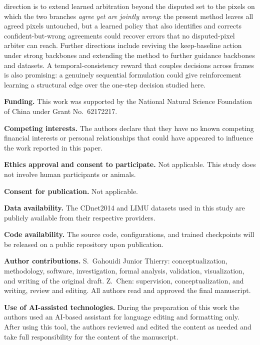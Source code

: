 \documentclass[sn-basic]{sn-jnl}
\begin{document}
direction is to extend learned arbitration beyond the disputed set to the pixels on which
the two branches \emph{agree yet are jointly wrong}: the present method leaves all agreed
pixels untouched, but a learned policy that also identifies and corrects confident-but-wrong
agreements could recover errors that no disputed-pixel arbiter can reach. Further
directions include reviving the keep-baseline action under strong backbones and
extending the method to further guidance backbones and datasets. A temporal-consistency
reward that couples decisions across frames is also promising: a genuinely sequential
formulation could give reinforcement learning a structural edge over the one-step
decision studied here.



\backmatter


\noindent\textbf{Funding.} This work was supported by the National Natural Science
Foundation of China under Grant No.~62172217.

\medskip\noindent\textbf{Competing interests.} The authors declare that they have no
known competing financial interests or personal relationships that could have appeared
to influence the work reported in this paper.

\medskip\noindent\textbf{Ethics approval and consent to participate.} Not applicable.
This study does not involve human participants or animals.

\medskip\noindent\textbf{Consent for publication.} Not applicable.

\medskip\noindent\textbf{Data availability.} The CDnet2014 and LIMU datasets used in
this study are publicly available from their respective providers.

\medskip\noindent\textbf{Code availability.} The source code, configurations, and
trained checkpoints will be released on a public repository upon publication.

\medskip\noindent\textbf{Author contributions.}
S.~Gahouidi Junior Thierry: conceptualization, methodology, software, investigation,
formal analysis, validation, visualization, and writing of the original draft.
Z.~Chen: supervision, conceptualization, and writing, review and editing.
All authors read and approved the final manuscript.

\medskip\noindent\textbf{Use of AI-assisted technologies.}
During the preparation of this work the authors used an AI-based assistant for language
editing and formatting only. After using this tool, the authors reviewed and edited the
content as needed and take full responsibility for the content of the manuscript.
\end{document}
